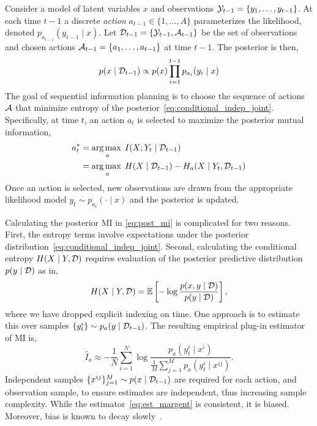 Consider a model of latent variables $x$ and observations $\mathcal{Y}_{t-1}
= \{y_1,\ldots,y_{t-1}\}$.  At each time $t-1$ a discrete
\emph{action} $a_{t-1} \in \{1,\ldots,A\}$ parameterizes the
likelihood, denoted \mbox{$p_{a_{t-1}}(y_{t-1} \mid x)$}.  Let
$\mathcal{D}_{t-1} = \{\mathcal{Y}_{t-1},\mathcal{A}_{t-1}\}$ be the set of observations
and chosen actions \mbox{$\mathcal{A}_{t-1} =
\{a_1,\ldots,a_{t-1}\}$} at time $t-1$.  The posterior is then,
\begin{equation}\label{eq:conditional_indep_joint}
  p(x\mid \mathcal{D}_{t-1}) \propto
    p(x) \prod_{i=1}^{t-1} p_{a_i}(y_i \mid x)
\end{equation}
The goal of sequential information planning is to choose the sequence
of actions $\mathcal{A}$ that minimize entropy of the
posterior~\eqref{eq:conditional_indep_joint}.  Specifically, at time
$t$, an action $a_t$ is selected to maximize the posterior mutual
information,
\begin{align}\label{eq:post_mi}
  a_t^{*} &= \operatorname*{arg\,max\;}_a I(X;Y_t \mid \mathcal{D}_{t-1}) \notag \\
          &= \operatorname*{arg\,max\;}_a H(X\mid \mathcal{D}_{t-1}) - H_a(X \mid Y_t, \mathcal{D}_{t-1})
\end{align}
Once an action is selected, new observations are drawn from the
appropriate likelihood model $y_t \sim p_{a_t}(\cdot \mid x)$ and the
posterior is updated.


Calculating the posterior MI in \EQN\eqref{eq:post_mi} is complicated
for two reasons.  First, the entropy terms involve expectations under
the posterior distribution~\eqref{eq:conditional_indep_joint}.
Second, calculating the conditional entropy $H(X\mid Y, \mathcal{D})$ requires
evaluation of the posterior predictive distribution $p(y\mid \mathcal{D})$
as in,
\[
  H(X\mid Y, \mathcal{D}) = \mathbb{E}\left[
    - \log \frac{p(x,y\mid \mathcal{D})}{ p(y\mid \mathcal{D}) } \right],
\]
where we have dropped explicit indexing on time.  One approach is to
estimate this over samples \mbox{$\{y^i_t\} \sim
p_a(y\mid \mathcal{D}_{t-1})$}.  The resulting empirical plug-in estimator
of MI is,
\begin{equation}\label{eq:est_margent}
  \hat{I}_a \approx - \frac{1}{N} \sum_{i=1}^N \log \frac{
    p_a(y_t^i\mid x^i) }{\frac{1}{M}
        \sum_{j=1}^M p_a(y_t^i \mid x^{ij})}.
\end{equation}
Independent samples $\{x^{ij}\}_{j=1}^M \sim p(x \mid \mathcal{D}_{t-1})$
are required for each action, and observation sample, to ensure
estimates are independent, thus increasing sample complexity.  While
the estimator~\eqref{eq:est_margent} is consistent, it is biased.
Moreover, bias is known to decay slowly~\citep{zheng2018robust,
rainforth2018nesting}.

